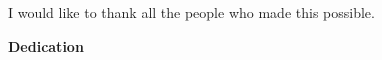 I would like to thank all the people who made this possible.
\cleardoublepage


\begin{center}\textbf{Dedication}\end{center}


\cleardoublepage

\renewcommand\contentsname{Table of Contents}
\tableofcontents
\cleardoublepage
{}

\listoftables
\cleardoublepage
{}		%

\listoffigures
\cleardoublepage
{}		%



